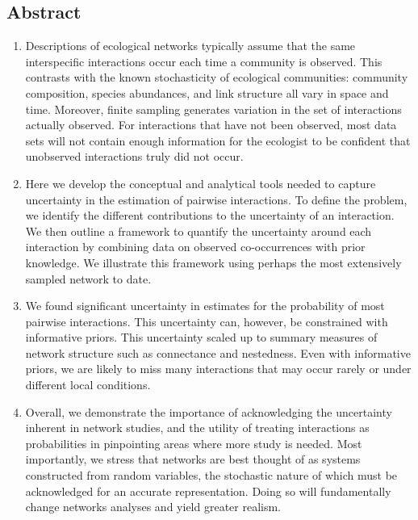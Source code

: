 \documentclass[12pt]{article}
\begin{document}
\begin{spacing}{2.0}

\section*{Abstract}

  \begin{enumerate}

    \item  Descriptions of ecological networks typically assume that the same interspecific interactions occur each time a community is observed. This contrasts with the known stochasticity of ecological communities: community composition, species abundances, and link structure all vary in space and time. Moreover, finite sampling generates variation in the set of interactions actually observed. For interactions that have not been observed, most data sets will not contain enough information for the ecologist to be confident that unobserved interactions truly did not occur.
    \item Here we develop the conceptual and analytical tools needed to capture uncertainty in the estimation of pairwise interactions. To define the problem, we identify the different contributions to the uncertainty of an interaction. We then outline a framework to quantify the uncertainty around each interaction by combining data on observed co-occurrences with prior knowledge. We illustrate this framework using perhaps the most extensively sampled network to date. 
    \item We found significant uncertainty in estimates for the probability of most pairwise interactions. This uncertainty can, however, be constrained with informative priors. This uncertainty scaled up to summary measures of network structure such as connectance and nestedness. Even with informative priors, we are likely to miss many interactions that may occur rarely or under different local conditions. 
    \item Overall, we demonstrate the importance of acknowledging the uncertainty inherent in network studies, and the utility of treating interactions as probabilities in pinpointing areas where more study is needed. Most importantly, we stress that networks are best thought of as systems constructed from random variables, the stochastic nature of which must be acknowledged for an accurate representation. Doing so will fundamentally change networks analyses and yield greater realism.
\end{enumerate}



\end{spacing}
\end{document}
